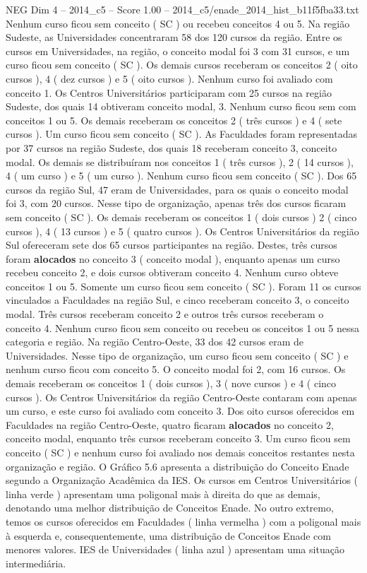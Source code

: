 \begin{textsample}{NEG Dim 4 – 2014\_c5 – Score 1.00 – 2014\_c5/enade\_2014\_hist\_b11f5fba33.txt}
Nenhum curso ficou sem conceito ( SC ) ou recebeu conceitos 4 ou 5.
Na região Sudeste, as Universidades concentraram 58 dos 120 cursos da região.
Entre os cursos em Universidades, na região, o conceito modal foi 3 com 31 cursos, e um curso ficou sem conceito ( SC ).
Os demais cursos receberam os conceitos 2 ( oito cursos ), 4 ( dez cursos ) e 5 ( oito cursos ).
Nenhum curso foi avaliado com conceito 1.
Os Centros Universitários participaram com 25 cursos na região Sudeste, dos quais 14 obtiveram conceito modal, 3.
Nenhum curso ficou sem com conceitos 1 ou 5.
Os demais receberam os conceitos 2 ( três cursos ) e 4 ( sete cursos ).
Um curso ficou sem conceito ( SC ).
As Faculdades foram representadas por 37 cursos na região Sudeste, dos quais 18 receberam conceito 3, conceito modal.
Os demais se distribuíram nos conceitos 1 ( três cursos ), 2 ( 14 cursos ), 4 ( um curso ) e 5 ( um curso ).
Nenhum curso ficou sem conceito ( SC ).
Dos 65 cursos da região Sul, 47 eram de Universidades, para os quais o conceito modal foi 3, com 20 cursos.
Nesse tipo de organização, apenas três dos cursos ficaram sem conceito ( SC ).
Os demais receberam os conceitos 1 ( dois cursos ) 2 ( cinco cursos ), 4 ( 13 cursos ) e 5 ( quatro cursos ).
Os Centros Universitários da região Sul ofereceram sete dos 65 cursos participantes na região.
Destes, três cursos foram \textbf{alocados} no conceito 3 ( conceito modal ), enquanto apenas um curso recebeu conceito 2, e dois cursos obtiveram conceito 4.
Nenhum curso obteve conceitos 1 ou 5.
Somente um curso ficou sem conceito ( SC ).
Foram 11 os cursos vinculados a Faculdades na região Sul, e cinco receberam conceito 3, o conceito modal.
Três cursos receberam conceito 2 e outros três cursos receberam o conceito 4.
Nenhum curso ficou sem conceito ou recebeu os conceitos 1 ou 5 nessa categoria e região.
Na região Centro-Oeste, 33 dos 42 cursos eram de Universidades.
Nesse tipo de organização, um curso ficou sem conceito ( SC ) e nenhum curso ficou com conceito 5.
O conceito modal foi 2, com 16 cursos.
Os demais receberam os conceitos 1 ( dois cursos ), 3 ( nove cursos ) e 4 ( cinco cursos ).
Os Centros Universitários da região Centro-Oeste contaram com apenas um curso, e este curso foi avaliado com conceito 3.
Dos oito cursos oferecidos em Faculdades na região Centro-Oeste, quatro ficaram \textbf{alocados} no conceito 2, conceito modal, enquanto três cursos receberam conceito 3.
Um curso ficou sem conceito ( SC ) e nenhum curso foi avaliado nos demais conceitos restantes nesta organização e região.
O Gráfico 5.6 apresenta a distribuição do Conceito Enade segundo a Organização Acadêmica da IES.
Os cursos em Centros Universitários ( linha verde ) apresentam uma poligonal mais à direita do que as demais, denotando uma melhor distribuição de Conceitos Enade.
No outro extremo, temos os cursos oferecidos em Faculdades ( linha vermelha ) com a poligonal mais à esquerda e, consequentemente, uma distribuição de Conceitos Enade com menores valores.
IES de Universidades ( linha azul ) apresentam uma situação intermediária.

\end{textsample}
